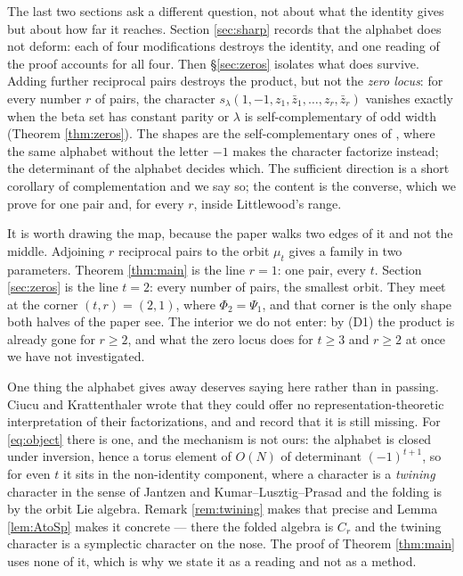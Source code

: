 \documentclass[11pt,reqno]{amsart}
\theoremstyle{plain}
\theoremstyle{definition}
\newcommand{\zt}{\mu_t}
\begin{document}
The last two sections ask a different question, not about what the identity gives but about how far
it reaches. Section \ref{sec:sharp} records that the alphabet does not deform: each of four
modifications destroys the identity, and one reading of the proof accounts for all four. Then
\S\ref{sec:zeros} isolates what does survive. Adding further reciprocal pairs
destroys the product, but not the \emph{zero locus}: for every number $r$ of pairs, the character
$s_\lambda(1,-1,z_1,\bar z_1,\dots,z_r,\bar z_r)$ vanishes exactly when the beta set has constant
parity or $\lambda$ is self-complementary of odd width (Theorem \ref{thm:zeros}). The shapes are the
self-complementary ones of \cite{AB19}, where the same alphabet without the letter $-1$ makes the
character factorize instead; the determinant of the alphabet decides which. The sufficient direction
is a short corollary of complementation and we say so; the content is the converse, which we prove
for one pair and, for every $r$, inside Littlewood's range.

It is worth drawing the map, because the paper walks two edges of it and not the middle. Adjoining
$r$ reciprocal pairs to the orbit $\zt$ gives a family in two parameters. Theorem \ref{thm:main} is
the line $r=1$: one pair, every $t$. Section \ref{sec:zeros} is the line $t=2$: every number of
pairs, the smallest orbit. They meet at the corner $(t,r)=(2,1)$, where $\Phi_2=\Psi_1$, and that
corner is the only shape both halves of the paper see. The interior we do not enter: by (D1) the
product is already gone for $r\ge2$, and what the zero locus does for $t\ge3$ and $r\ge2$ at once we
have not investigated.

One thing the alphabet gives away deserves saying here rather than in passing. Ciucu and
Krattenthaler \cite{CK09} wrote that they could offer no representation-theoretic interpretation of
their factorizations, and \cite{AB19} and \cite{AK25} record that it is still missing. For
\eqref{eq:object} there is one, and the mechanism is not ours: the alphabet is closed under
inversion, hence a torus element of $O(N)$ of determinant $(-1)^{t+1}$, so for even $t$ it sits in
the non-identity component, where a character is a \emph{twining} character in the sense of Jantzen
\cite{Jantzen} and Kumar--Lusztig--Prasad \cite{KLP} and the folding is by the orbit Lie algebra.
Remark \ref{rem:twining} makes that precise and Lemma \ref{lem:AtoSp} makes it concrete --- there the
folded algebra is $C_r$ and the twining character is a symplectic character on the nose. The proof of
Theorem \ref{thm:main} uses none of it, which is why we state it as a reading and not as a method.
\end{document}
